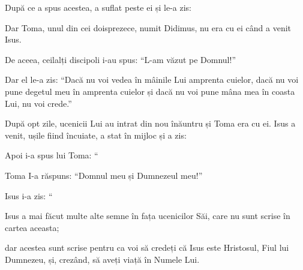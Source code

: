{După ce a spus acestea, a suflat peste ei și le-a zis:
{}



\par }{\PP {}Dar Toma, unul din cei doisprezece, numit Didimus, nu era cu ei când a venit Isus.

De aceea, ceilalți discipoli i-au spus: “L-am văzut pe Domnul!”

\par }{\PP Dar el le-a zis: “Dacă nu voi vedea în mâinile Lui amprenta cuielor, dacă nu voi pune degetul meu în amprenta cuielor și dacă nu voi pune mâna mea în coasta Lui, nu voi crede.”


\par }{\PP {}După opt zile, ucenicii Lui au intrat din nou înăuntru și Toma era cu ei. Isus a venit, ușile fiind încuiate, a stat în mijloc și a zis:
{}

Apoi i-a spus lui Toma: “{}


\par }{\PP {}Toma I-a răspuns: “Domnul meu și Dumnezeul meu!”


\par }{\PP {}Isus i-a zis: “{}


\par }{\PP {}Isus a mai făcut multe alte semne în fața ucenicilor Săi, care nu sunt scrise în cartea aceasta;

dar acestea sunt scrise pentru ca voi să credeți că Isus este Hristosul, Fiul lui Dumnezeu, și, crezând, să aveți viață în Numele Lui.



\par }
